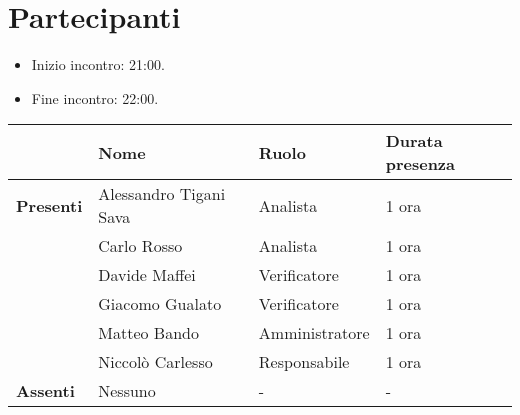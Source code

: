 \section*{Partecipanti}

\begin{itemize}
	\item Inizio incontro: 21:00.
	\item Fine incontro: 22:00.
\end{itemize}


\begin{center}
	\begin{tabular}{llll}
		                  & \textbf{Nome}          & \textbf{Ruolo} & \textbf{Durata presenza} \\
		\hline
		\textbf{Presenti} & Alessandro Tigani Sava & Analista 		& 1 ora	\\
		                  & Carlo Rosso            & Analista 		& 1 ora	\\
		                  & Davide Maffei          & Verificatore	& 1 ora	\\
		                  & Giacomo Gualato        & Verificatore	& 1 ora	\\
		                  & Matteo Bando           & Amministratore	& 1 ora	\\
		                  & Niccolò Carlesso       & Responsabile	& 1 ora	\\
		\hline
		\textbf{Assenti}  & Nessuno                & -              & -		\\
	\end{tabular}
\end{center}
